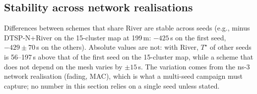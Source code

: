 \subsection{Stability across network realisations}
Differences between schemes that share River are stable across seeds (e.g., \lmtour{} minus DTSP-N+River on the
15-cluster map at 199\,m: $-425$\,s on the first seed, $-429\pm70$\,s on the others). Absolute values are not: with River,
$T^\star$ of other seeds is 56--197\,s above that of the first seed on the 15-cluster map, while a scheme that does not
depend on the mesh varies by $\pm15$\,s. The variation comes from the ns-3 network realisation (fading, MAC), which is
what a multi-seed campaign must capture; no number in this section relies on a single seed unless stated.
